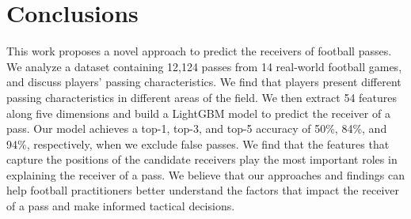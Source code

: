 \section{Conclusions} \label{conclusions}

This work proposes a novel approach to predict the receivers of football passes.
We analyze a dataset containing 12,124 passes from 14 real-world football games, and discuss players' passing characteristics. We find that players present different passing characteristics in different areas of the field.
We then extract 54 features along five dimensions and build a LightGBM model to predict the receiver of a pass. 
Our model achieves a top-1, top-3, and top-5 accuracy of 50\%, 84\%, and 94\%, respectively, when we exclude false passes.
We find that the features that capture the positions of the candidate receivers play the most important roles in explaining the receiver of a pass.
We believe that our approaches and findings can help football practitioners better understand the factors that impact the receiver of a pass and make informed tactical decisions.
